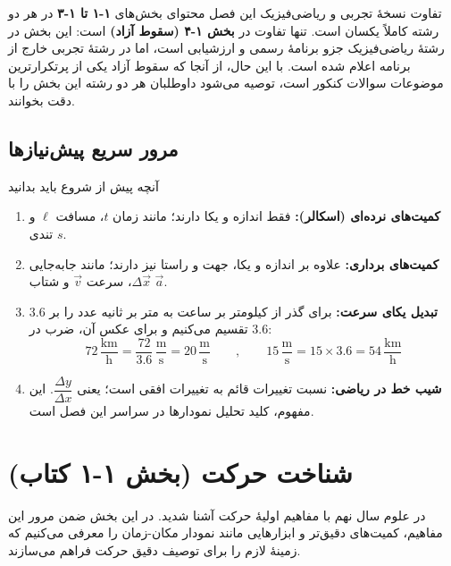 \documentclass[12pt, a4paper]{article}
\begin{document}
\begin{tipbox}{تفاوت نسخهٔ تجربی و ریاضی‌فیزیک این فصل}
محتوای بخش‌های \textbf{۱-۱ تا ۱-۳} در هر دو رشته کاملاً یکسان است. تنها تفاوت در \textbf{بخش ۱-۴ (سقوط آزاد)} است: این بخش در رشتهٔ ریاضی‌فیزیک جزو برنامهٔ رسمی و ارزشیابی است، اما در رشتهٔ تجربی خارج از برنامه اعلام شده است. با این حال، از آنجا که سقوط آزاد یکی از پرتکرارترین موضوعات سوالات کنکور است، توصیه می‌شود داوطلبان هر دو رشته این بخش را با دقت بخوانند.
\end{tipbox}

\subsection{مرور سریع پیش‌نیازها}

\begin{summarybox}{آنچه پیش از شروع باید بدانید}
\begin{enumerate}
    \item \textbf{کمیت‌های نرده‌ای (اسکالر):} فقط اندازه و یکا دارند؛ مانند زمان $t$، مسافت $\ell$ و تندی $s$.
    \item \textbf{کمیت‌های برداری:} علاوه بر اندازه و یکا، جهت و راستا نیز دارند؛ مانند جابه‌جایی $\Delta\vec{x}$، سرعت $\vec{v}$ و شتاب $\vec{a}$.
    \item \textbf{تبدیل یکای سرعت:} برای گذر از کیلومتر بر ساعت به متر بر ثانیه عدد را بر $3.6$ تقسیم می‌کنیم و برای عکس آن، ضرب در $3.6$:
    \[
    72\,\frac{\text{km}}{\text{h}} = \frac{72}{3.6}\,\frac{\text{m}}{\text{s}} = 20\,\frac{\text{m}}{\text{s}}
    \qquad , \qquad
    15\,\frac{\text{m}}{\text{s}} = 15 \times 3.6 = 54\,\frac{\text{km}}{\text{h}}
    \]
    \item \textbf{شیب خط در ریاضی:} نسبت تغییرات قائم به تغییرات افقی است؛ یعنی $\dfrac{\Delta y}{\Delta x}$. این مفهوم، کلید تحلیل نمودارها در سراسر این فصل است.
\end{enumerate}
\end{summarybox}

\section{شناخت حرکت (بخش ۱-۱ کتاب)}

در علوم سال نهم با مفاهیم اولیهٔ حرکت آشنا شدید. در این بخش ضمن مرور این مفاهیم، کمیت‌های دقیق‌تر و ابزارهایی مانند نمودار مکان-زمان را معرفی می‌کنیم که زمینهٔ لازم را برای توصیف دقیق حرکت فراهم می‌سازند.
\end{document}
